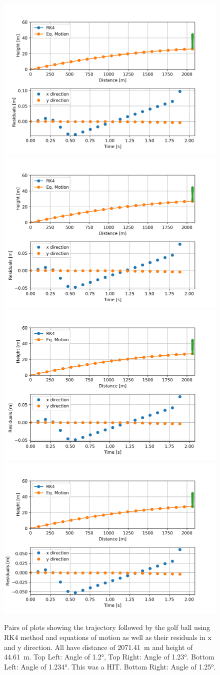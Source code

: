 \begin{figure}[ht]
    \centering
    \includegraphics[width=.49\textwidth]{figures/a1-2x2071-4148y44-610104.png}
    \includegraphics[width=.49\textwidth]{figures/a1-23x2071-4148y44-610104.png}
    \includegraphics[width=.49\textwidth]{figures/a1-234x2071-4148y44-610104.png}
    \includegraphics[width=.49\textwidth]{figures/a1-25x2071-4148y44-610104.png}
    \caption{Pairs of plots showing the trajectory followed by the golf ball using RK4 method and equations of motion as well as their residuals in x and y direction. All have distance of \SI{2071.41}{\m} and height of \SI{44.61}{\m}. Top Left: Angle of \ang{1.2},  Top Right: Angle of \ang{1.23}. Bottom Left: Angle of \ang{1.234}. This was a HIT. Bottom Right: Angle of \ang{1.25}.}
    \label{fig:diffAnglesSamePos}
\end{figure}











